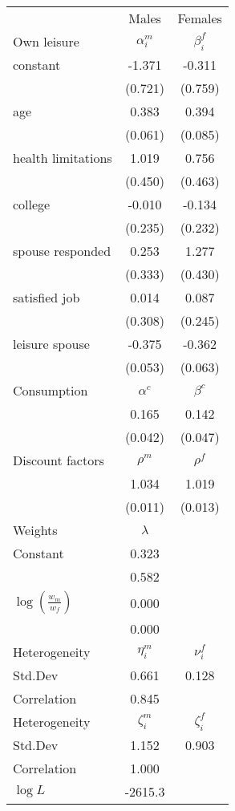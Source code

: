 \begin{tabular}{lcc} 
\hline\hline 
 & Males & Females \\ 
Own leisure & $\alpha_{i}^{m}$ & $\beta_{i}^{f}$ \\ 
constant & -1.371 & -0.311 \\ 
 & (0.721) & (0.759) \\ 
age & 0.383 & 0.394 \\ 
 & (0.061) & (0.085) \\ 
health limitations & 1.019 & 0.756 \\ 
 & (0.450) & (0.463) \\ 
college & -0.010 & -0.134 \\ 
 & (0.235) & (0.232) \\ 
spouse responded & 0.253 & 1.277 \\ 
 & (0.333) & (0.430) \\ 
satisfied job & 0.014 & 0.087 \\ 
 & (0.308) & (0.245) \\ 
leisure spouse & -0.375 & -0.362 \\ 
 & (0.053) & (0.063) \\ 
Consumption & $\alpha^{c}$ & $\beta^{c}$ \\ 
 & 0.165 & 0.142 \\ 
 & (0.042) & (0.047) \\ 
Discount factors & $\rho^m$ & $\rho^f$ \\ 
 & 1.034 & 1.019 \\ 
 & (0.011) & (0.013) \\ 
Weights & $\lambda$ &  \\ 
Constant & 0.323 &  \\ 
 & 0.582 &  \\ 
$\log(\frac{w_m}{w_f})$ & 0.000 &  \\ 
 & 0.000 &  \\ 
Heterogeneity & $\eta_i^m$ & $\nu_i^f$ \\ 
Std.Dev & 0.661 & 0.128 \\ 
Correlation & 0.845 &  \\ 
Heterogeneity & $\zeta_i^m$ & $\zeta_i^f$ \\ 
Std.Dev & 1.152 & 0.903 \\ 
Correlation & 1.000 &  \\ 
\hline 
$\log L$ & -2615.3 & \\ 
\hline \hline 
\end{tabular} 
